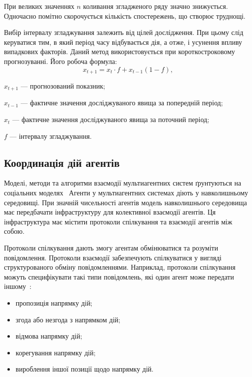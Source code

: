 При великих значеннях $n$ коливання згладженого ряду значно знижується. Одночасно помітно скорочується кількість спостережень, що створює труднощі.

Вибір інтервалу згладжування залежить від цілей дослідження. При цьому слід керуватися тим, в який період часу відбувається дія, а отже, і усунення впливу випадкових факторів.
Даний метод використовується при короткостроковому прогнозуванні. Його робоча формула:
\begin{equation} \label{eq:means}
	x_{t+1} = x_t \cdot f + x_{t - 1} (1 - f),
\end{equation}
\begin{description}
	\item[де] $x_{t+1}$ --- прогнозований показник;
	\item $x_{t-1}$ --- фактичне значення досліджуваного явища за попередній період;
	\item $x_{t}$ --- фактичне значення досліджуваного явища за поточний період;
	\item $f$ --- інтервалу згладжування.
\end{description}

\subsection{Координація дій агентів}
Моделі, методи та алгоритми взаємодії мультиагентних систем ґрунтуються на соціальних моделях~\cite{GerhardWeiss1996,Burkov}
Агенти у мультиагентних системах діють у навколишньому середовищі.
При значній чисельності агентів модель навколишнього середовища має передбачати інфраструктуру для колективної взаємодії агентів.
Ця інфраструктура має містити протоколи спілкування та взаємодії агентів між собою.

Протоколи спілкування дають змогу агентам обмінюватися та розуміти повідомлення.
Протоколи взаємодії забезпечують спілкуватися у вигляді структурованого обміну повідомленнями. Наприклад, протоколи спілкування можуть специфікувати такі типи повідомлень, які один агент може передати іншому~\cite{Fipa}:
\begin{itemize}
	\item пропозиція напрямку дій;
	\item згода або незгода з напрямком дій;
	\item відмова напрямку дій;
	\item корегування напрямку дій;
	\item вироблення іншої позиції щодо напрямку дій.
\end{itemize}

